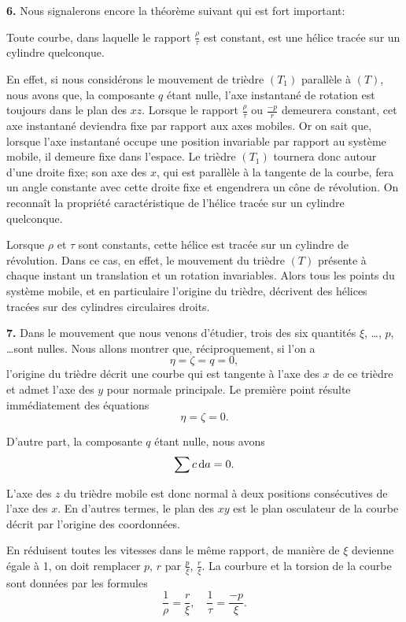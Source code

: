 \textbf{6.} Nous signalerons encore la théorème suivant qui est fort important:
\begin{theorem}
	Toute courbe, dans laquelle le rapport $\frac\rho\tau$ est constant, est une hélice tracée sur un cylindre 
	quelconque.
\end{theorem}

En effet, si nous considérons le mouvement de trièdre $(T_1)$ parallèle à $(T)$, nous avons que, la composante $q$ 
étant nulle, l'axe instantané de rotation est toujours dans le plan des $xz$. Lorsque le rapport $\frac\rho\tau$ ou 
$\frac{-p}{r}$ demeurera constant, cet axe instantané deviendra fixe par rapport aux axes mobiles. Or on sait que, 
lorsque l'axe instantané occupe une position invariable par rapport au système mobile, il demeure fixe dans l'espace. 
Le trièdre $(T_1)$ tournera donc autour d'une droite fixe; son axe des $x$, qui est parallèle à la tangente de la 
courbe, fera un angle constante avec cette droite fixe et engendrera un cône de révolution. On reconnaît la propriété 
caractéristique de l'hélice tracée sur un cylindre quelconque.

Lorsque $\rho$ et $\tau$ sont constants, cette hélice est tracée sur un cylindre de révolution. Dans ce cas, en effet, 
le mouvement du trièdre $(T)$ présente à chaque instant un translation et un rotation invariables. Alors tous les 
points du système mobile, et en particulaire l'origine du trièdre, décrivent des hélices tracées sur des cylindres 
circulaires droits.

\textbf{7.} Dans le mouvement que nous venons d'étudier, trois des six quantités $\xi$, \ldots, $p$, \ldots sont 
nulles. Nous allons montrer que, réciproquement, si l'on a
\[
	\eta = \zeta = q = 0,
\]
l'origine du trièdre décrit une courbe qui est tangente à l'axe des $x$ de ce trièdre et admet l'axe des $y$ pour 
normale principale. Le première point résulte immédiatement des équations
\[
	\eta = \zeta = 0.
\]

D'autre part, la composante $q$ étant nulle, nous avons
\[
	\sum{c \ensuremath{\operatorname{d}\!{a}}} = 0.
\]

L'axe des $z$ du trièdre mobile est donc normal à deux positions consécutives de l'axe des $x$. En d'autres termes, le 
plan des $xy$ est le plan osculateur de la courbe décrit par l'origine des coordonnées.

En réduisent toutes les vitesses dans le même rapport, de manière de $\xi$ devienne égale à 1, on doit remplacer $p$, 
$r$ par $\frac{p}{\xi}$, $\frac{r}{\xi}$. La courbure et la torsion de la courbe sont données par les formules
\begin{equation}
	\frac{1}{\rho} = \frac{r}{\xi}, \quad \frac{1}{\tau} = \frac{-p}{\xi}.
	\label{eqn-1.16}
\end{equation}


